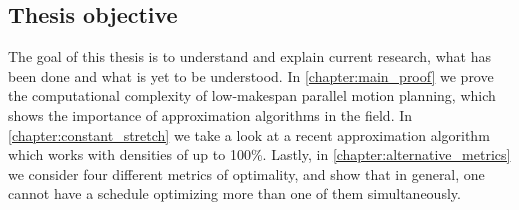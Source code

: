 \subsection{Thesis objective}

The goal of this thesis is to understand and explain current research, what has been done and what is yet to be understood. In \cref{chapter:main_proof} we prove the computational complexity of low-makespan parallel motion planning, which shows the importance of approximation algorithms in the field. In \cref{chapter:constant_stretch} we take a look at a recent approximation algorithm which works with densities of up to 100\%. Lastly, in \cref{chapter:alternative_metrics} we consider four different metrics of optimality, and show that in general, one cannot have a schedule optimizing more than one of them simultaneously. 

